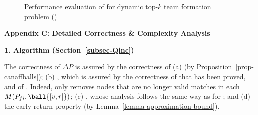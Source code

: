 \begin{figure}[tb!]
\begin{center}
		\hspace{0.2ex}
		\vspace{-2ex}
		
	\end{center}
	\vspace{-3.0ex}
	\caption{Performance evaluation of \inc for dynamic top-$k$ team formation problem (\youtube)}
	\label{exp-inc-youtube}
	\vspace{-3.0ex}
\end{figure}



\vspace{1ex}
\noindent
{\large \textbf{Appendix C: Detailed Correctness \& Complexity Analysis}}
\label{sec-apd-complexity}

\noindent
{\textbf{1. Algorithm \incp (Section~\ref{subsec-Qinc})}}

The correctness of \incp \wrt $\Delta P$ is assured by
the correctness of (a) \identifyaffball (by Proposition~\ref{prop-canaffballs});
(b) \incmatch, which is assured by the correctness of \rgraphsim that has been proved, and of \patedgeinsert. Indeed, \patedgeinsert only removes
nodes that are no longer valid matches in each $M(P_{fi}, \ball{[v,r]})$;
(c) \comb, whose analysis follows the same way as for \patedgeinsert; and
(d) the early return property (by Lemma~\ref{lemma-approximation-bound}).

